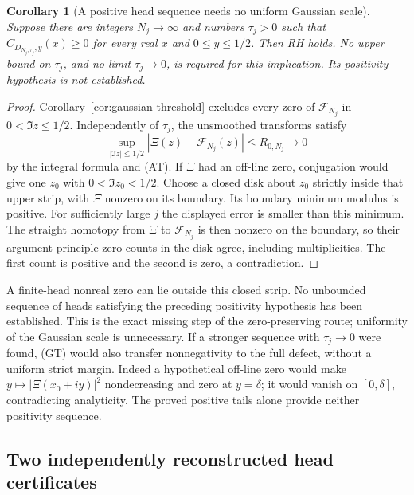 \documentclass[11pt]{article}
\newtheorem{corollary}[theorem]{Corollary}
\theoremstyle{remark}\newtheorem{remark}[theorem]{Remark}
\begin{document}
\begin{corollary}[A positive head sequence needs no uniform Gaussian scale]
\label{cor:head-exhaustion}
Suppose there are integers $N_j\to\infty$ and numbers $\tau_j>0$
such that $C_{D_{N_j,\tau_j},y}(x)\ge0$ for every real $x$
and $0\le y\le1/2$. Then RH holds.
No upper bound on $\tau_j$, and no limit $\tau_j\to0$, is required
for this implication. Its positivity hypothesis is not established.
\end{corollary}
\begin{proof}
Corollary~\ref{cor:gaussian-threshold} excludes every zero of
$\mathcal F_{N_j}$ in $0<\Im z\le1/2$.
Independently of $\tau_j$, the unsmoothed transforms satisfy
\[
 \sup_{|\Im z|\le1/2}|\Xi(z)-\mathcal F_{N_j}(z)|
              \le R_{0,N_j}\longrightarrow0
\]
by the integral formula and (AT).
If $\Xi$ had an off-line zero, conjugation would give one
$z_0$ with $0<\Im z_0<1/2$.
Choose a closed disk about $z_0$ strictly inside that upper strip,
with $\Xi$ nonzero on its boundary. Its boundary minimum modulus
is positive. For sufficiently large $j$ the displayed error is
smaller than this minimum. The straight homotopy from $\Xi$ to
$\mathcal F_{N_j}$ is then nonzero on the boundary, so their
argument-principle zero counts in the disk agree, including
multiplicities. The first count is positive and the second is
zero, a contradiction.
\end{proof}

A finite-head nonreal zero can lie outside this closed strip.
No unbounded sequence of heads satisfying the preceding positivity
hypothesis has been established. This is the exact missing step of
the zero-preserving route; uniformity of the Gaussian scale is unnecessary.
If a stronger sequence with $\tau_j\to0$ were found, (GT) would also
transfer nonnegativity to the full defect, without a uniform strict margin.
Indeed a hypothetical off-line zero would make
$y\mapsto|\Xi(x_0+iy)|^2$ nondecreasing and zero at $y=\delta$;
it would vanish on $[0,\delta]$, contradicting analyticity.
The proved positive tails alone provide neither positivity sequence.

\subsection{Two independently reconstructed head certificates}
\end{document}
